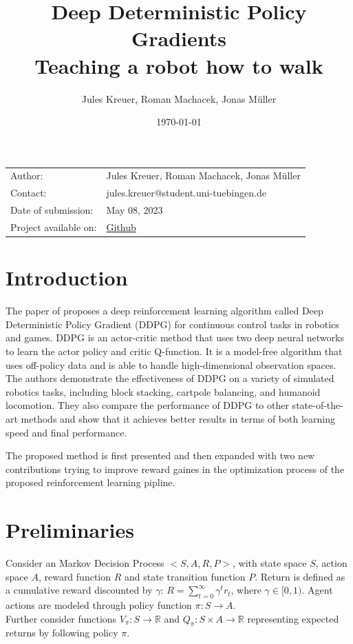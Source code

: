 \documentclass{article}
\title{Deep Deterministic Policy Gradients\\Teaching a robot how to walk}
\author{Jules Kreuer, Roman Machacek, Jonas Müller}
\date{\today}
\begin{document}
\maketitle
\noindent\begin{tabular}{ll}
Author: & Jules Kreuer, Roman Machacek, Jonas Müller\\
Contact: & jules.kreuer@student.uni-tuebingen.de\\
Date of submission: & May 08, 2023\\
Project available on: & \href{https://github.com/not-a-feature/deepq-rl-continuous-control/}{Github}
\end{tabular}
\section{Introduction}\label{sec: Intro}
The paper of \cite{lillicrap2015continuous} proposes a deep reinforcement learning algorithm called Deep Deterministic Policy Gradient (DDPG) for continuous control tasks in robotics and games. DDPG is an actor-critic method that uses two deep neural networks to learn the actor policy and critic Q-function. It is a model-free algorithm that uses off-policy data and is able to handle high-dimensional observation spaces. The authors demonstrate the effectiveness of DDPG on a variety of simulated robotics tasks, including block stacking, cartpole balancing, and humanoid locomotion. They also compare the performance of DDPG to other state-of-the-art methods and show that it achieves better results in terms of both learning speed and final performance.

The proposed method is first presented and then expanded with two new contributions trying to improve reward gaines in the optimization process of the proposed reinforcement learning pipline.

\section{Preliminaries}\label{sec: ...}
Consider an Markov Decision Process $<S, A, R, P>$, with state space $S$, action space $A$, reward function $R$ and state transition function $P$.
\newline
Return is defined as a cumulative reward discounted by $\gamma$: $R = \sum_{t=0}^\infty{\gamma^t r_t}$, where $\gamma \in [0, 1)$.
\newline
Agent actions are modeled through policy function $\pi: S \longrightarrow A$. \\
Further consider functions $V_\pi: S \longrightarrow \mathbb{R}$ and $Q_\pi: S \times A \longrightarrow \mathbb{R}$ representing expected returns by following policy $\pi$.
\end{document}
